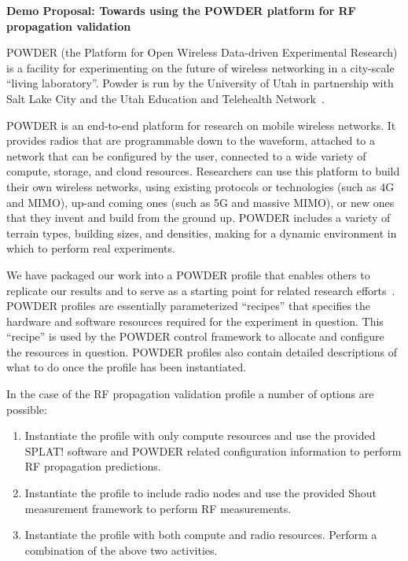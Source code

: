 \documentclass[10pt]{article}
\begin{document}

\begin{center}
  \Large\bfseries
  Demo Proposal: Towards using the POWDER platform for RF propagation validation 
\end{center}

POWDER (the Platform for Open Wireless Data-driven Experimental Research) is a
facility for experimenting on the future of wireless networking in a city-scale ``living 
laboratory''. Powder is run by the University of Utah in partnership with Salt Lake City
and the Utah Education and Telehealth Network~\cite{b1,powderweb}.

POWDER is an end-to-end platform for research on mobile wireless networks. It provides radios 
that are programmable down to the waveform, attached to a network that can be configured by 
the user, connected to a wide variety of compute, storage, and cloud resources. Researchers can
use this platform to build their own wireless networks, using existing protocols or technologies 
(such as 4G and MIMO), up-and coming ones (such as 5G and massive MIMO), or new ones 
that they invent and build from the ground up.
POWDER includes a variety of terrain types, building sizes, and densities, making for a dynamic 
environment in which to perform real experiments.

We have packaged our work into a POWDER profile that enables others to
replicate our results and to serve as a starting point for related research
efforts~\cite{paper_profile}. POWDER profiles are essentially parameterized
``recipes'' that specifies the hardware and software resources required
for the experiment in question. This ``recipe'' is used by the POWDER
control framework to allocate and configure the resources in question. 
POWDER profiles also contain detailed descriptions of what to
do once the profile has been instantiated.

In the case of the RF propagation validation profile a number of options
are possible:
\begin{enumerate}
\item Instantiate the profile with only compute resources and use the provided
SPLAT! software and POWDER related configuration information to perform 
RF propagation predictions.
\item Instantiate the profile to include radio nodes and use the provided
Shout measurement framework to perform RF measurements.
\item Instantiate the profile with both compute and radio resources. Perform
a combination of the above two activities.
\end{enumerate}
\end{document}
